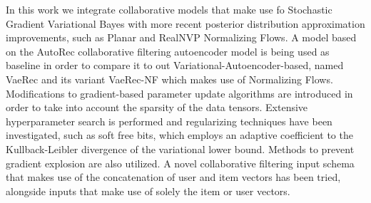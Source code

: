 In this work we integrate collaborative models that make use fo Stochastic Gradient
Variational Bayes with more recent posterior distribution approximation improvements,
such as Planar and RealNVP Normalizing Flows.
A model based on the AutoRec collaborative filtering autoencoder model is being
used as baseline in order to compare it to out Variational-Autoencoder-based, named VaeRec and
its variant VaeRec-NF which makes use of Normalizing Flows.
Modifications to gradient-based parameter update algorithms are introduced
in order to take into account the sparsity of the data tensors.
Extensive hyperparameter search is performed and regularizing techniques have been investigated, such as soft free bits, which employs an adaptive
coefficient to the Kullback-Leibler divergence of the variational lower bound.
Methods to prevent gradient explosion are also utilized.
A novel collaborative filtering input schema that makes use of the concatenation of user 
and item vectors has been tried, 
alongside inputs that make use of solely the item or user vectors.
